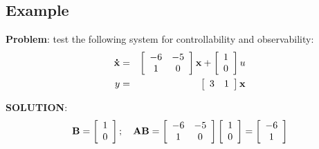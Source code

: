 \subsection*{Example} %
\label{sub:example}

\textbf{Problem}: test the following system for controllability and observability:
\begin{eqnarray*}
	 {\bf{\dot x}}  & = &   \left[ {\begin{array}{*{20}c}
	   { - 6} & { - 5}  \\
	   1 & 0  \\
	\end{array}} \right]{\bf{x}} + \left[ {\begin{array}{*{20}c}
	   1  \\
	   0  \\
	\end{array}} \right]u \\
		 y & = &  \left[ {\begin{array}{*{20}c}
	   3 & 1  \\
	\end{array}} \right]{\bf{x}} \\ 
\end{eqnarray*}


\textbf{SOLUTION}:
\[
{\bf{B}} = \left[ {\begin{array}{*{20}c}
   1  \\
   0  \\
\end{array}} \right];\quad {\bf{AB}} = \left[ {\begin{array}{*{20}c}
   { - 6} & { - 5}  \\
   1 & 0  \\
\end{array}} \right]\left[ {\begin{array}{*{20}c}
   1  \\
   0  \\
\end{array}} \right] = \left[ {\begin{array}{*{20}c}
   { - 6}  \\
   1  \\
\end{array}} \right]
\]

